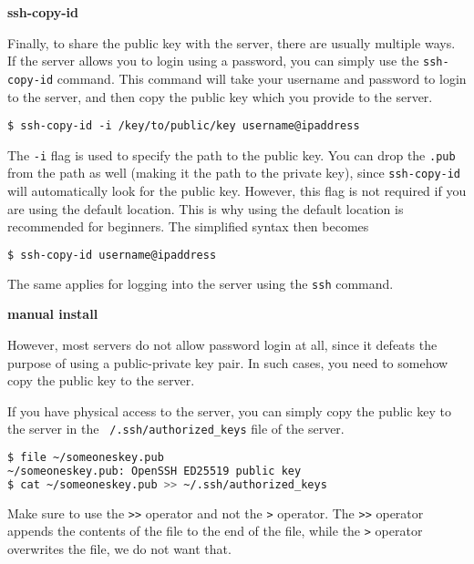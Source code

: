 \textbf{ssh-copy-id}

Finally, to share the public key with the server,
there are usually multiple ways. If the server
allows you to login using a password, you can
simply use the \texttt{ssh-copy-id} command.
This command will take your username and password
to login to the server, and then copy the public
key which you provide to the server.

\begin{lstlisting}
$ ssh-copy-id -i /key/to/public/key username@ipaddress
\end{lstlisting}

\begin{remark}
  The \texttt{-i} flag is used to specify the path
  to the public key. You can drop the \texttt{.pub}
  from the path as well (making it the path to the
  private key), since \texttt{ssh-copy-id} will
  automatically look for the public key.
  However, this flag is not required if you
  are using the default location.
  This is why using the default location is
  recommended for beginners.
  The simplified syntax then becomes
  \begin{lstlisting}[language=bash]
  $ ssh-copy-id username@ipaddress \end{lstlisting}
  The same applies for logging into the server
  using the \texttt{ssh} command.
\end{remark}

\textbf{manual install}

However, most servers do not allow password login
at all, since it defeats the purpose of using
a public-private key pair. In such cases, you
need to somehow copy the public key to the server.

If you have physical access to the server, you
can simply copy the public key to the server
in the \texttt{~/.ssh/authorized\_keys} file
of the server.

\begin{lstlisting}[language=bash]
$ file ~/someoneskey.pub
~/someoneskey.pub: OpenSSH ED25519 public key
$ cat ~/someoneskey.pub >> ~/.ssh/authorized_keys
\end{lstlisting}

\begin{remark}
  Make sure to use the \texttt{>>} operator and
  not the \texttt{>} operator. The \texttt{>>}
  operator appends the contents of the file to
  the end of the file, while the \texttt{>}
  operator overwrites the file, we do not want that.
\end{remark}

